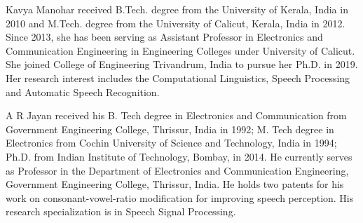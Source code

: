 \documentclass{ieeeaccess}
\begin{document}
\begin{IEEEbiography}
{Kavya Manohar} received B.Tech. degree from the University of Kerala, India in 2010 and M.Tech. degree from the University of Calicut, Kerala, India in 2012. Since 2013, she has been serving as Assistant Professor in Electronics and Communication Engineering in Engineering Colleges under University of Calicut. She joined College of Engineering Trivandrum, India to pursue her Ph.D. in 2019.  Her research interest includes the Computational Linguistics, Speech Processing and Automatic Speech Recognition.


\end{IEEEbiography}

\begin{IEEEbiography}{A R Jayan}  received his B. Tech degree in Electronics and Communication from Government Engineering College, Thrissur, India in 1992; M. Tech degree  in Electronics from Cochin University of Science and Technology, India in 1994; Ph.D. from  Indian Institute of Technology, Bombay, in 2014. He currently serves as Professor in the Department of Electronics and Communication Engineering, Government Engineering College, Thrissur, India. He holds two patents for his work on consonant-vowel-ratio modification for improving speech perception. His research specialization is in Speech Signal Processing.

\end{IEEEbiography}
\end{document}
